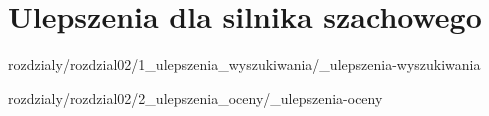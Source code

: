 \chapter{Ulepszenia dla silnika szachowego}
\label{ch:implementacja-silnika-szachowego}

 {rozdzialy/rozdzial02/1_ulepszenia_wyszukiwania/_ulepszenia-wyszukiwania}

 {rozdzialy/rozdzial02/2_ulepszenia_oceny/_ulepszenia-oceny}

